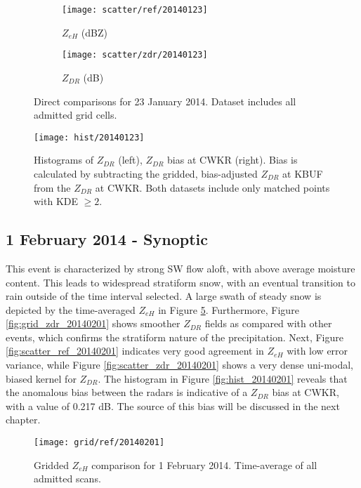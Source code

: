 \begin{figure}[H]
\centering
   \begin{subfigure}{0.49\linewidth} \centering
     \texttt{[image: scatter/ref/20140123]}
     \caption{$Z_{eH}$ (dBZ)}\label{fig:scatter_ref_20140123}
   \end{subfigure}
   \begin{subfigure}{0.49\linewidth} \centering
     \texttt{[image: scatter/zdr/20140123]}
     \caption{$Z_{DR}$ (dB)}\label{fig:scatter_zdr_20140123}
   \end{subfigure}
\caption{Direct comparisons for 23 January 2014. Dataset includes all admitted grid cells.}
\label{fig:scatter_20140123}
\end{figure}

\begin{figure}[H]
\texttt{[image: hist/20140123]}\centering
\caption{Histograms of $Z_{DR}$ (left), $Z_{DR}$ bias at CWKR (right). Bias is calculated by subtracting the gridded, bias-adjusted $Z_{DR}$ at KBUF from the
$Z_{DR}$ at CWKR. Both datasets include only matched points with KDE $\geq 2$. } 
\label{fig:hist_20140123}
\end{figure}

\subsection{1 February 2014 - Synoptic}
This event is characterized by strong SW flow aloft, with above average moisture content. This leads to
widespread stratiform snow, with an eventual transition to rain outside of the time interval selected.
A large swath of steady snow is depicted by the time-averaged $Z_{eH}$ in Figure \ref{fig:grid_ref_20140201}. 
Furthermore, Figure \ref{fig:grid_zdr_20140201} shows smoother $Z_{DR}$
fields as compared with other events, which confirms the stratiform nature of the precipitation. Next, Figure \ref{fig:scatter_ref_20140201} indicates very
good agreement in $Z_{eH}$ with low error variance, while Figure \ref{fig:scatter_zdr_20140201} shows a very dense uni-modal, biased kernel for $Z_{DR}$. The
histogram in Figure \ref{fig:hist_20140201} reveals that the anomalous bias between the radars is indicative of a $Z_{DR}$ bias at CWKR, with a value of
0.217 dB. The source of this bias will be discussed in the next chapter.

\begin{figure}[H]
\texttt{[image: grid/ref/20140201]}
\caption{Gridded $Z_{eH}$ comparison for 1 February 2014. Time-average of all admitted scans.} 
\label{fig:grid_ref_20140201}
\end{figure}


